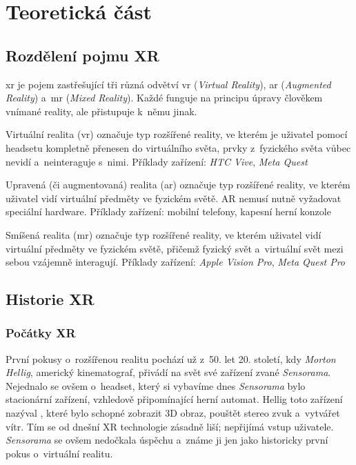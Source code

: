 \part{Teoretická část}

\chapter{Rozdělení pojmu XR}

\gls{xr} je pojem zastřešující tři různá odvětví \poml \gls{vr} (\textit{Virtual Reality}), \gls{ar} (\textit{Augmented Reality}) a~\gls{mr} (\textit{Mixed Reality}). Každé funguje na principu úpravy člověkem vnímané reality, ale přistupuje k~němu jinak.

Virtuální realita (\gls{vr}) označuje typ rozšířené reality, ve kterém je uživatel pomocí headsetu kompletně přenesen do virtuálního světa, prvky z~fyzického světa vůbec nevidí a~neinteraguje s~nimi. Příklady zařízení: \textit{HTC Vive}, \textit{Meta Quest}

Upravená (či augmentovaná) realita (\gls{ar}) označuje typ rozšířené reality, ve kterém uživatel vidí virtuální předměty ve fyzickém světě. AR nemusí nutně vyžadovat speciální hardware. Příklady zařízení: mobilní telefony, kapesní herní konzole

Smíšená realita (\gls{mr}) označuje typ rozšířené reality, ve kterém uživatel vidí virtuální předměty ve fyzickém světě, přičemž fyzický svět a~virtuální svět mezi sebou vzájemně interagují. Příklady zařízení: \textit{Apple Vision Pro}, \textit{Meta Quest Pro} \cite{xr_disambiguation}

\chapter{Historie XR}

\section{Počátky XR}

První pokusy o~rozšířenou realitu pochází už z~50. let 20. století, kdy \textit{Morton Hellig}, americký kinematograf, přivádí na svět své zařízení zvané \textit{Sensorama}. Nejednalo se ovšem o~headset, který si vybavíme dnes \poml \textit{Sensorama} bylo stacionární zařízení, vzhledově připomínající herní automat. Hellig toto zařízení nazýval , které bylo schopné zobrazit 3D obraz, pouštět stereo zvuk a~vytvářet vítr. Tím se od dnešní XR technologie zásadně liší; nepřijímá vstup uživatele. \textit{Sensorama} se ovšem nedočkala úspěchu a~známe ji jen jako historicky první pokus o~virtuální realitu. \cite{otechnice}

